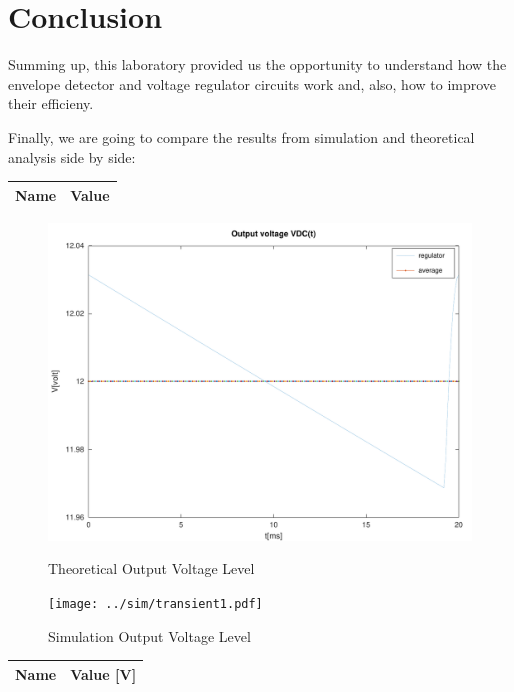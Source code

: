 \section{Conclusion}
\label{sec:conclusion}

Summing up, this laboratory provided us the opportunity to understand how the envelope detector and voltage regulator circuits work and, also, how to improve their efficieny.\par
Finally, we are going to compare the results from simulation and theoretical analysis side by side: \par

\begin{center}
  \begin{tabular}{ | c | c | }
    \hline    
    {\bf Name} & {\bf Value} \\ \hline
    
    \hline
  \end{tabular}
\end{center}

\begin{figure}[H]
      \includegraphics[width=\linewidth]{../mat/outputdc.pdf}
      \caption{Theoretical Output Voltage Level}
    \endminipage\hfill
      \texttt{[image: ../sim/transient1.pdf]}
      \caption{Simulation Output Voltage Level}
    \endminipage\hfill
\end{figure}

\begin{center}
  \begin{tabular}{ | c | c | }
    \hline    
    {\bf Name} & {\bf Value [V]} \\ \hline
    
    \hline
  \end{tabular}
\end{center}

